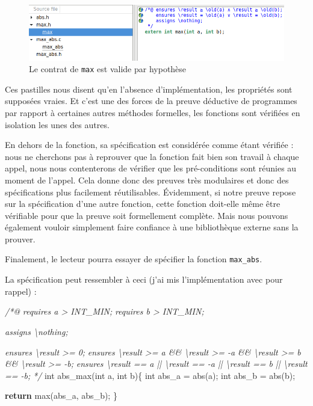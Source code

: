 \documentclass[12pt,francais,]{scrbook}
\newenvironment{Shaded}{}{}
\newcommand{\KeywordTok}[1]{\textcolor[rgb]{0.00,0.44,0.13}{\textbf{{#1}}}}
\newcommand{\DataTypeTok}[1]{\textcolor[rgb]{0.56,0.13,0.00}{{#1}}}
\newcommand{\CommentTok}[1]{\textcolor[rgb]{0.38,0.63,0.69}{\textit{{#1}}}}
\newcommand{\NormalTok}[1]{{#1}}
\begin{document}
\begin{figure}[htbp]
\centering
\includegraphics[scale=0.5]{2-4-max_abs.png}
\caption{Le contrat de \texttt{max} est valide par hypothèse}
\label{fig:2-4-max_abs}
\end{figure}

Ces pastilles nous disent qu'en l'absence d'implémentation, les
propriétés sont supposées vraies. Et c'est une des forces de la preuve
déductive de programmes par rapport à certaines autres méthodes
formelles, les fonctions sont vérifiées en isolation les unes des
autres.

En dehors de la fonction, sa spécification est considérée comme étant
vérifiée : nous ne cherchons pas à reprouver que la fonction fait bien
son travail à chaque appel, nous nous contenterons de vérifier que les
pré-conditions sont réunies au moment de l'appel. Cela donne donc des
preuves très modulaires et donc des spécifications plus facilement
réutilisables. Évidemment, si notre preuve repose sur la spécification
d'une autre fonction, cette fonction doit-elle même être vérifiable pour
que la preuve soit formellement complète. Mais nous pouvons également
vouloir simplement faire confiance à une bibliothèque externe sans la
prouver.

Finalement, le lecteur pourra essayer de spécifier la fonction
\texttt{max\_abs}.

La spécification peut ressembler à ceci (j'ai mis l'implémentation avec
pour rappel) :

\begin{footnotesize}\begin{Shaded}
\begin{Highlighting}[]
\CommentTok{/*@}
\CommentTok{  requires a > INT_MIN;}
\CommentTok{  requires b > INT_MIN;}

\CommentTok{  assigns \textbackslash{}nothing;}

\CommentTok{  ensures \textbackslash{}result >= 0;}
\CommentTok{  ensures \textbackslash{}result >= a && \textbackslash{}result >= -a && \textbackslash{}result >= b && \textbackslash{}result >= -b;}
\CommentTok{  ensures \textbackslash{}result == a || \textbackslash{}result == -a || \textbackslash{}result == b || \textbackslash{}result == -b;}
\CommentTok{*/}
\DataTypeTok{int} \NormalTok{abs_max(}\DataTypeTok{int} \NormalTok{a, }\DataTypeTok{int} \NormalTok{b)\{}
  \DataTypeTok{int} \NormalTok{abs_a = abs(a);}
  \DataTypeTok{int} \NormalTok{abs_b = abs(b);}

  \KeywordTok{return} \NormalTok{max(abs_a, abs_b);}
\NormalTok{\}}
\end{Highlighting}
\end{Shaded}\end{footnotesize}
\end{document}
